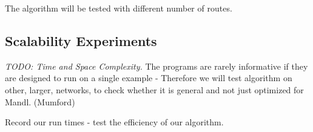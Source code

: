 



The algorithm will be tested with different number of routes.



\subsection{Scalability Experiments}
\emph{\color{blue} TODO: Time and Space Complexity.}
The programs are rarely informative if they are designed to run on a single example - Therefore we will test algorithm on other, larger, networks, to check whether it is general and not just optimized for Mandl. (Mumford)


Record our run times - test the efficiency of our algorithm.




